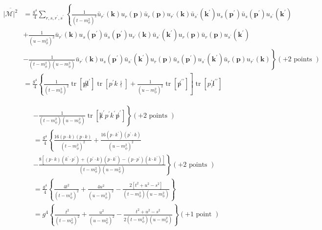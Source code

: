 \documentclass[10pt, letterpaper]{article}
\begin{document}
$$
\begin{aligned}
\overline{|\mathcal{M}|^2} & =\frac{g^4}{4} \sum_{r, s, r^{\prime}, s^{\prime}}\left\{\frac{1}{\left(t-m_\phi^2\right)^2} \bar{u}_{r^{\prime}}(\mathbf{k}) u_r(\mathbf{p}) \bar{u}_r(\mathbf{p}) u_{r^{\prime}}(\mathbf{k}) \bar{u}_{s^{\prime}}\left(\mathbf{k}^{\prime}\right) u_s\left(\mathbf{p}^{\prime}\right) \bar{u}_s\left(\mathbf{p}^{\prime}\right) u_{s^{\prime}}\left(\mathbf{k}^{\prime}\right)\right. \\
& +\frac{1}{\left(u-m_\phi^2\right)^2} \bar{u}_{r^{\prime}}(\mathbf{k}) u_s\left(\mathbf{p}^{\prime}\right) \bar{u}_s\left(\mathbf{p}^{\prime}\right) u_{r^{\prime}}(\mathbf{k}) \bar{u}_{s^{\prime}}\left(\mathbf{k}^{\prime}\right) u_r(\mathbf{p}) \bar{u}_r(\mathbf{p}) u_{s^{\prime}}\left(\mathbf{k}^{\prime}\right) \\
& \left.-\frac{1}{\left(t-m_\phi^2\right)\left(u-m_\phi^2\right)} \bar{u}_{r^{\prime}}(\mathbf{k}) u_s\left(\mathbf{p}^{\prime}\right) \bar{u}_{s^{\prime}}\left(\mathbf{k}^{\prime}\right) u_r(\mathbf{p}) \bar{u}_s\left(\mathbf{p}^{\prime}\right) u_{s^{\prime}}\left(\mathbf{k}^{\prime}\right) \bar{u}_r(\mathbf{p}) u_{r^{\prime}}(\mathbf{k})\right\}(+2 \text { points }) \\
& =\frac{g^4}{4}\left\{\frac{1}{\left(t-m_\phi^2\right)^2} \operatorname{tr}\left[\not p \not l^{\prime}\right] \operatorname{tr}\left[p^{\prime} k \nmid\right]+\frac{1}{\left(u-m_\phi^2\right)^2} \operatorname{tr}\left[\not p^{\prime \prime}\right]\right] \operatorname{tr}\left[p^{\prime} \not l^{\prime \prime}\right]
\end{aligned}
$$


$$
\begin{aligned}
& \left.-\frac{1}{\left(t-m_\phi^2\right)\left(u-m_\phi^2\right)} \operatorname{tr}\left[\not k^{\prime} p^{\prime} k^{\prime} \not p^{\prime}\right]\right\}(+2 \text { points }) \\
& =\frac{g^4}{4}\left\{\frac{16(p \cdot k)(p \cdot k)}{\left(t-m_\phi^2\right)^2}+\frac{16\left(p \cdot k^{\prime}\right)\left(p^{\prime} \cdot k\right)}{\left(u-m_\phi^2\right)^2}\right. \\
& \left.-\frac{8\left[(p \cdot k)\left(k^{\prime} \cdot p^{\prime}\right)+\left(p^{\prime} \cdot k\right)\left(p \cdot k^{\prime}\right)-\left(p \cdot p^{\prime}\right)\left(k \cdot k^{\prime}\right)\right]}{\left(t-m_\phi^2\right)\left(u-m_\phi^2\right)}\right\}(+2 \text { points }) \\
& =\frac{g^4}{4}\left\{\frac{4 t^2}{\left(t-m_\phi^2\right)^2}+\frac{4 u^2}{\left(u-m_\phi^2\right)^2}-\frac{2\left[t^2+u^2-s^2\right]}{\left(t-m_\phi^2\right)\left(u-m_\phi^2\right)}\right\} \\
& =g^4\left\{\frac{t^2}{\left(t-m_\phi^2\right)^2}+\frac{u^2}{\left(u-m_\phi^2\right)^2}-\frac{t^2+u^2-s^2}{2\left(t-m_\phi^2\right)\left(u-m_\phi^2\right)}\right\}(+1 \text { point })
\end{aligned}
$$
\end{document}
